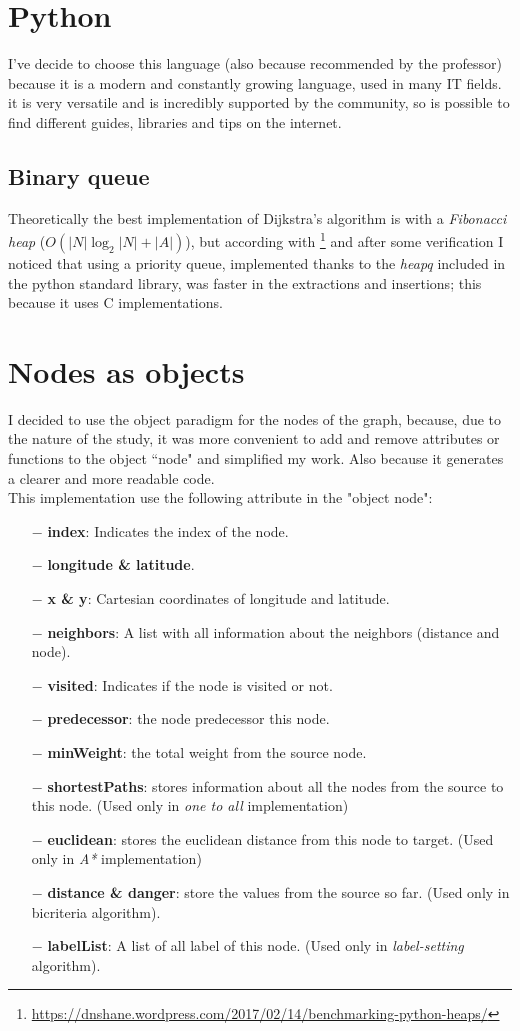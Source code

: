\documentclass[a4paper,11pt]{report}
\begin{document}
\section{Python}
I've decide to choose this language (also because recommended by the professor) because it is a modern and constantly growing language, used in many IT fields. it is very versatile and is incredibly supported by the community, so is possible to find different guides, libraries and tips on the internet.
\subsection{Binary queue}
Theoretically the best implementation of Dijkstra's algorithm is with a \textit{Fibonacci heap} ($O(|N|\log_2|N|+|A|)$), but according with \footnote{\url{https://dnshane.wordpress.com/2017/02/14/benchmarking-python-heaps/}} and after some verification I noticed that using a priority queue, implemented thanks to the \textit{heapq} included in the python standard library, was faster in the extractions and insertions; this because it uses C implementations.

\section{Nodes as objects}
I decided to use the object paradigm for the nodes of the graph, because, due to the nature of the study, it was more convenient to add and remove attributes or functions to the object ``node" and simplified my work. Also because it generates a clearer and more readable code.\\
This implementation use the following attribute in the "object node":
\begin{itemize}
	\item[$-$] \textbf{index}: Indicates the index of the node.
	\item[$-$] \textbf{longitude \& latitude}.
	\item[$-$] \textbf{x \& y}: Cartesian coordinates of longitude and latitude.
	\item[$-$] \textbf{neighbors}: A list with all information about the neighbors (distance and node).
	\item[$-$] \textbf{visited}: Indicates if the node is visited or not.
	\item[$-$] \textbf{predecessor}: the node predecessor this node.
	\item[$-$] \textbf{minWeight}: the total weight from the source node.
	\item[$-$] \textbf{shortestPaths}: stores information about all the nodes from the source to this node. (Used only in \textit{one to all} implementation)
	\item[$-$] \textbf{euclidean}: stores the euclidean distance from this node to target. (Used only in \textit{A*} implementation)
	\item[$-$] \textbf{distance \& danger}: store the values from the source so far. (Used only in bicriteria algorithm).
	\item[$-$] \textbf{labelList}: A list of all label of this node. (Used only in \textit{label-setting} algorithm).
\end{itemize}
\end{document}

